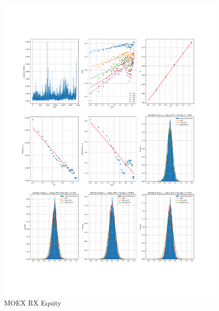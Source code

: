     \begin{figure}[h]
        \centering
        \includegraphics[width=\textwidth]{fig/MOEX RX Equity.pdf}
        \caption{MOEX RX Equity}
    \end{figure} 
        
